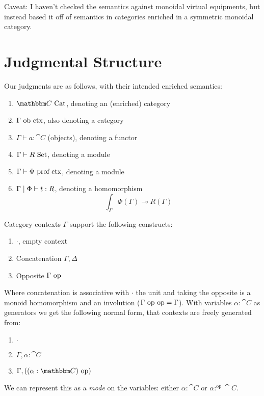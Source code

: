 \documentclass{article}
\begin{document}
\maketitle

Caveat: I haven't checked the semantics against monoidal virtual
equipments, but instead based it off of semantics in categories
enriched in a symmetric monoidal category.

\section{Judgmental Structure}

Our judgments are as follows, with their intended enriched semantics:
\begin{enumerate}
\item $\cat C \isaCat$, denoting an (enriched) category
\item $\Gamma \,\,\textrm{ob ctx}$, also denoting a category
\item $\Gamma \vdash a : \cat C$ (objects), denoting a functor
\item $\Gamma \vdash R \,\,\textrm{Set}$, denoting a module
\item $\Gamma \vdash \Phi \,\,\textrm{prof ctx}$, denoting a module
\item $\Gamma\mathrel{|} \Phi \vdash t : R$, denoting a homomorphism 
  \[ \int_\Gamma\Phi(\Gamma) \multimap R(\Gamma)\]
\end{enumerate}

Category contexts $\Gamma$ support the following constructs:
\begin{enumerate}
\item $\cdot$, empty context
\item Concatenation $\Gamma,\Delta$
\item Opposite $\Gamma \,\,\mathrm{op}$
\end{enumerate}

Where concatenation is associative with $\cdot$ the unit and taking
the opposite is a monoid homomorphism and an involution ($\Gamma
\,\,\mathrm{op}\,\,\mathrm{op} = \Gamma$). With variables $\alpha:\cat C$ as
generators we get the following normal form, that contexts are freely
generated from:
\begin{enumerate}
\item $\cdot$
\item $\Gamma , \alpha : \cat C$
\item $\Gamma , ((\alpha : \cat C) \postfixop)$
\end{enumerate}
We can represent this as a \emph{mode} on the variables: either
$\alpha : \cat C$ or $\alpha :^{\mathrm{op}} \cat C$.
\end{document}
